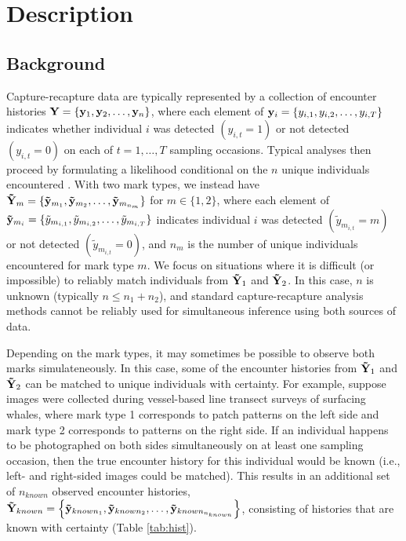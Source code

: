 \documentclass[12pt]{article}
\begin{document}
\section{Description}
\subsection{Background}

Capture-recapture data are typically represented by a collection of encounter histories ${\bf Y} = \{{\bf y}_1,{\bf y}_2,\ldots,{\bf y}_n\}$, where each element of ${\bf y}_i=\{y_{i,1},y_{i,2},\ldots,y_{i,T}\}$ indicates whether individual $i$ was detected $(y_{i,t}=1)$ or not detected $(y_{i,t}=0)$ on each of $t=1,\dots,T$ sampling occasions. Typical analyses then proceed by formulating a likelihood conditional on the $n$ unique individuals encountered \citep[e.g.,][]{WilliamsEtAl2002}. With two mark types, we instead have ${\bf {\tilde Y}}_m = \{{\bf {\tilde y}}_{m_1},{\bf {\tilde y}}_{m_2},\ldots,{\bf {\tilde y}}_{m_{n_m}}\}$ for $m \in \{1,2\}$, where each element of ${\bf {\tilde y}}_{m_i}=\{{\tilde y}_{m_{i,1}},{\tilde y}_{m_{i,2}},\ldots,{\tilde y}_{m_{i,T}}\}$ indicates individual $i$ was detected $({\tilde y}_{m_{i,t}}=m)$ or not detected $({\tilde y}_{m_{i,t}}=0)$, and $n_m$ is the number of unique individuals encountered for mark type $m$. We focus on situations where it is difficult (or impossible) to reliably match individuals from ${\bf {\tilde Y}}_1$ and ${\bf {\tilde Y}}_2$. In this case, $n$ is unknown (typically $n \le n_1+n_2$), and standard capture-recapture analysis methods cannot be reliably used for simultaneous inference using both sources of data.

Depending on the mark types, it may sometimes be possible to observe both marks simulateneously. In this case, some of the encounter histories from ${\bf {\tilde Y}}_1$ and ${\bf {\tilde Y}}_2$ can be matched to unique individuals with certainty. For example, suppose images were collected during vessel-based line transect surveys of surfacing whales, where mark type 1 corresponds to patch patterns on the left side and mark type 2 corresponds to patterns on the right side. If an individual happens to be photographed on both sides simultaneously on at least one sampling occasion, then the true encounter history for this individual would be known (i.e., left- and right-sided images could be matched). This results in an additional set of $n_{known}$ observed encounter histories, ${\bf {\tilde Y}}_{known} = \left\{{\bf {\tilde y}}_{known_1},{\bf {\tilde y}}_{known_2},\ldots,{\bf {\tilde y}}_{known_{n_{known}}}\right\}$, consisting of histories that are known with certainty (Table \ref{tab:hist}).
\end{document}
